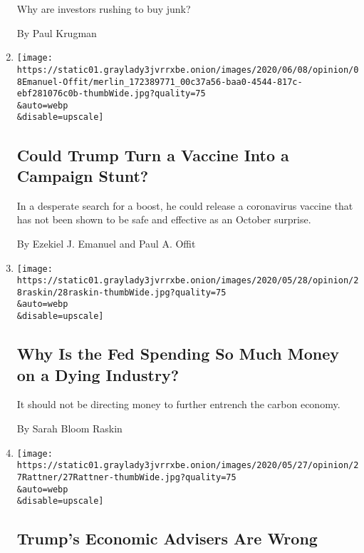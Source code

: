 \begin{enumerate}
  Why are investors rushing to buy junk?

  By Paul Krugman
\item
  \href{/2020/06/08/opinion/trump-coronavirus-vaccine.html}{}

  \texttt{[image: https://static01.graylady3jvrrxbe.onion/images/2020/06/08/opinion/08Emanuel-Offit/merlin\_172389771\_00c37a56-baa0-4544-817c-ebf281076c0b-thumbWide.jpg?quality=75\\\&auto=webp\\\&disable=upscale]}

  \hypertarget{could-trump-turn-a-vaccine-into-a-campaign-stunt}{%
  \subsection{Could Trump Turn a Vaccine Into a Campaign
  Stunt?}\label{could-trump-turn-a-vaccine-into-a-campaign-stunt}}

  In a desperate search for a boost, he could release a coronavirus
  vaccine that has not been shown to be safe and effective as an October
  surprise.

  By Ezekiel J. Emanuel and Paul A. Offit
\item
  \href{/2020/05/28/opinion/fed-fossil-fuels.html}{}

  \texttt{[image: https://static01.graylady3jvrrxbe.onion/images/2020/05/28/opinion/28raskin/28raskin-thumbWide.jpg?quality=75\\\&auto=webp\\\&disable=upscale]}

  \hypertarget{why-is-the-fed-spending-so-much-money-on-a-dying-industry}{%
  \subsection{Why Is the Fed Spending So Much Money on a Dying
  Industry?}\label{why-is-the-fed-spending-so-much-money-on-a-dying-industry}}

  It should not be directing money to further entrench the carbon
  economy.

  By Sarah Bloom Raskin
\item
  \href{/2020/05/27/opinion/coronavirus-economy-stimulus.html}{}

  \texttt{[image: https://static01.graylady3jvrrxbe.onion/images/2020/05/27/opinion/27Rattner/27Rattner-thumbWide.jpg?quality=75\\\&auto=webp\\\&disable=upscale]}

  \hypertarget{trumps-economic-advisers-are-wrong}{%
  \subsection{Trump's Economic Advisers Are
  Wrong}\label{trumps-economic-advisers-are-wrong}}


\end{enumerate}
